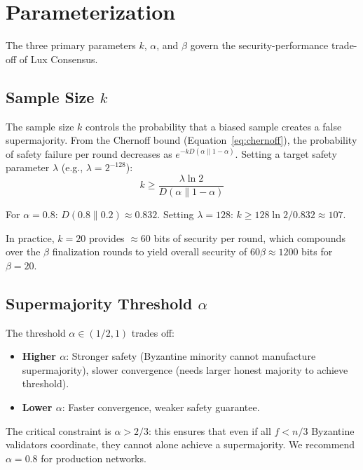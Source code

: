 \section{Parameterization}

\label{sec:params}

The three primary parameters $k$, $\alpha$, and $\beta$ govern the security-performance
trade-off of Lux Consensus.

\subsection{Sample Size $k$}

The sample size $k$ controls the probability that a biased sample creates a false
supermajority. From the Chernoff bound (Equation~\ref{eq:chernoff}), the probability of
safety failure per round decreases as $e^{-kD(\alpha \| 1-\alpha)}$. Setting a target
safety parameter $\lambda$ (e.g., $\lambda = 2^{-128}$):
\begin{equation}
k \geq \frac{\lambda \ln 2}{D(\alpha \| 1-\alpha)}
\label{eq:k_lower_bound}
\end{equation}

For $\alpha = 0.8$: $D(0.8 \| 0.2) \approx 0.832$.
Setting $\lambda = 128$: $k \geq 128 \ln 2 / 0.832 \approx 107$.

In practice, $k = 20$ provides $\approx 60$ bits of security per round, which compounds
over the $\beta$ finalization rounds to yield overall security of $60\beta \approx 1200$
bits for $\beta = 20$.

\subsection{Supermajority Threshold $\alpha$}

The threshold $\alpha \in (1/2, 1)$ trades off:
\begin{itemize}
\item \textbf{Higher $\alpha$}: Stronger safety (Byzantine minority cannot manufacture
supermajority), slower convergence (needs larger honest majority to achieve threshold).
\item \textbf{Lower $\alpha$}: Faster convergence, weaker safety guarantee.
\end{itemize}

The critical constraint is $\alpha > 2/3$: this ensures that even if all $f < n/3$
Byzantine validators coordinate, they cannot alone achieve a supermajority. We recommend
$\alpha = 0.8$ for production networks.

